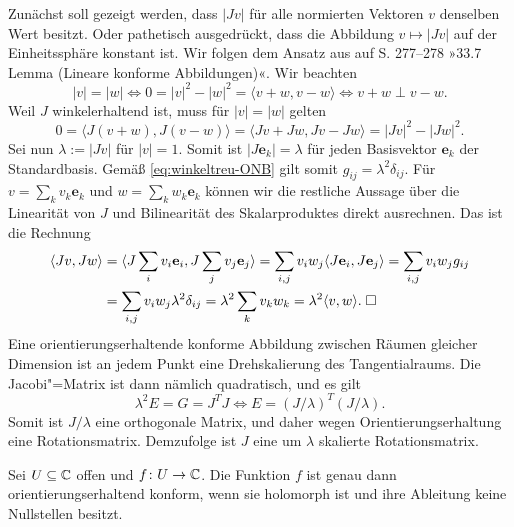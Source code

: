 \noindent{}
Zunächst soll gezeigt werden, dass $|Jv|$ für alle normierten
Vektoren $v$ denselben Wert besitzt. Oder pathetisch ausgedrückt,
dass die Abbildung $v\mapsto |Jv|$ auf der Einheitssphäre konstant ist.
Wir folgen dem Ansatz aus \cite{Kriegl} auf S. 277--278
»33.7 Lemma (Lineare konforme Abbildungen)«. Wir beachten%
\begin{equation}
|v| = |w| \iff 0 = |v|^2 - |w|^2 = \langle v+w,v-w\rangle \iff v+w\perp v-w.
\end{equation}
Weil $J$ winkelerhaltend ist, muss für $|v|=|w|$ gelten%
\begin{equation}
0 = \langle J(v+w), J(v-w)\rangle = \langle Jv+Jw,Jv-Jw\rangle
= |Jv|^2-|Jw|^2.
\end{equation}
Sei nun $\lambda:=|Jv|$ für $|v|=1$. Somit ist $|J\mathbf e_k|=\lambda$
für jeden Basisvektor $\mathbf e_k$ der Standardbasis. Gemäß
\eqref{eq:winkeltreu-ONB} gilt somit $g_{ij} = \lambda^2\delta_{ij}$.
Für $v = \sum_k v_k \mathbf e_k$ und $w = \sum_k w_k\mathbf e_k$
können wir die restliche Aussage über die Linearität von $J$
und Bilinearität des Skalarproduktes direkt ausrechnen. Das ist die
Rechnung
\begin{align*}
\langle Jv,Jw\rangle &= \langle J\sum_i v_i\mathbf e_i,J\sum_j v_j\mathbf e_j\rangle
= \sum_{i,j} v_i w_j\langle J\mathbf e_i,J\mathbf e_j\rangle
= \sum_{i,j} v_i w_j g_{ij}\\
&= \sum_{i,j} v_i w_j\lambda^2 \delta_{ij}
= \lambda^2\sum_k v_k w_k = \lambda^2\langle v,w\rangle.\;\Box
\end{align*}
Eine orientierungserhaltende konforme Abbildung zwischen Räumen
gleicher Dimension ist an jedem Punkt eine
Drehskalierung des
Tangentialraums. Die Jacobi"=Matrix ist dann nämlich quadratisch,
und es gilt
\begin{equation}
\lambda^2 E = G = J^T J \iff E = (J/\lambda)^T(J/\lambda).
\end{equation}
Somit ist $J/\lambda$ eine orthogonale Matrix, und daher wegen
Orientierungserhaltung eine Rotationsmatrix. Demzufolge ist $J$ eine
um $\lambda$ skalierte Rotationsmatrix.

\begin{corollary}
Sei $U\subseteq\mathbb C$ offen und $f\colon U\to\mathbb C$. Die Funktion
$f$ ist genau dann orientierungserhaltend konform, wenn sie holomorph
ist und ihre Ableitung keine Nullstellen besitzt.
\end{corollary}

